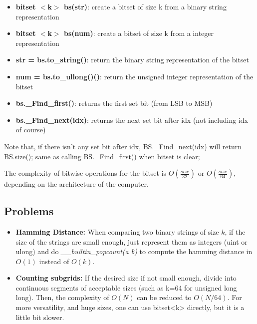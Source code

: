    \begin{itemize} 
        \item \textbf{bitset $<$k$>$ bs(str)}: create a bitset of size k from a binary string representation
        \item \textbf{bitset $<$k$>$ bs(num)}: create a bitset of size k from a integer representation
        \item \textbf{str = bs.to\_string()}: return the binary string representation of the bitset
        \item \textbf{num = bs.to\_ullong()()}: return the unsigned integer representation of the bitset
        \item \textbf{bs.\_Find\_first()}: returns the first set bit (from LSB to MSB)
        \item \textbf{bs.\_Find\_next(idx)}: returns the next set bit after idx (not including idx of course)
    \end{itemize}

    Note that, if there isn't any set bit after idx, BS.\_Find\_next(idx) will return BS.size(); 
    same as calling BS.\_Find\_first() when bitset is clear;

    The complexity of bitwise operations for the bitset is $O(\frac{size}{32})$ or $O(\frac{size}{64})$, 
    depending on the architecture of the computer.
    
    \subsection{Problems}
    
    \begin{itemize}
        \item \textbf{Hamming Distance:} When comparing two binary strings of size $k$, if the size of the strings are small enough, 
        just represent them as integers (uint or ulong) and do \textit{\_\_builtin\_popcount(a \^ b)} to compute the hamming distance in $O(1)$ instead of $O(k)$.

        \item \textbf{Counting subgrids:} If the desired size if not small enough, divide into continuous segments of acceptable sizes (such as k=64 for unsigned long long).
        Then, the complexity of $O(N)$ can be reduced to $O(N/64)$. For more versatility, and huge sizes, one can use bitset<k> directly, but it is a little bit slower.

    \end{itemize}